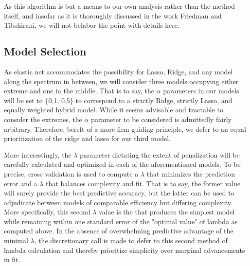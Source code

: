 \documentclass[11pt]{article}
\begin{document}
As this algorithm is but a means to our own analysis rather than the method itself, and insofar as it is thoroughly discussed in the work Friedman and Tibshirani, we will not belabor the point with details here.  


\subsection{Model Selection}

	As elastic net accommodates the possibility for Lasso, Ridge, and any model along the spectrum in between, we will consider three models occupying either extreme and one in the middle.  That is to say, the $\alpha$ parameters in our models will be set to \{0,1, 0.5\} to correspond to a strictly Ridge, strictly Lasso, and equally weighted hybrid model.  While it seems advisable and tractable to consider the extremes, the $\alpha$ parameter to be considered is admittedly fairly arbitrary.  Therefore, bereft of a more firm guiding principle, we defer to an equal prioritization of the ridge and lasso for our third model.  
	
	More interestingly, the $\lambda$ parameter dictating the extent of penalization will be carefully calculated and optimized in each of the aforementioned models.  To be precise, cross validation is used to compute a $\lambda$ that minimizes the prediction error and a $\lambda$ that balances complexity and fit.  That is to say, the former value will surely provide the best predictive accuracy, but the latter can be used to adjudicate between models of comparable efficiency but differing complexity.  More specifically, this second $\lambda$ value is the that produces the simplest model while remaining within one standard error of the "optimal value" of lambda as computed above.  In the absence of overwhelming predictive advantage of the minimal $\lambda$, the discretionary call is made to defer to this second method of lambda calculation and thereby prioritize simplicity over marginal advancements in fit.  
\end{document}
